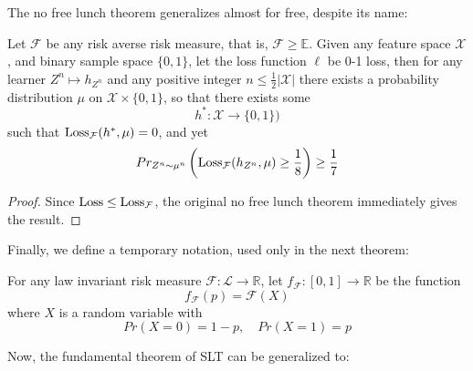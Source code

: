 The no free lunch theorem generalizes almost for free, despite its name:
\begin{theorem}
\label{theorem:nfl_2}
Let $\mathcal{F}$ be any risk averse risk measure, that is, $\mathcal{F} \ge \mathbb{E}$. Given any feature space $\mathcal{X}$, and binary sample space $\{0, 1\}$, let the loss function $\ell$ be 0-1 loss, then for any learner $Z^n \mapsto h_{Z^n}$ and any positive integer $n \le \frac 1 2 |\mathcal{X}|$ there exists a probability distribution $\mu$ on $\mathcal{X}\times\{0, 1\}$, so that there exists some 
$$h^* : \mathcal{X} \to \{0, 1\})$$
such that $\operatorname{Loss}_\mathcal{F}(h^*, \mu) = 0$, and yet
\begin{equation}
	\label{eq:nfl_2}
	Pr_{Z^n \sim \mu^n}\left(\operatorname{Loss}_\mathcal{F}(h_{Z^n}, \mu) \ge \frac 1 8\right) \ge \frac 1 7
\end{equation}
\end{theorem}
\begin{proof}
Since $\operatorname{Loss} \le \operatorname{Loss}_\mathcal{F}$, the original no free lunch theorem immediately gives the result.
\end{proof}

Finally, we define a temporary notation, used only in the next theorem:
\begin{notn}
For any law invariant risk measure $\mathcal{F}: \mathscr{L} \to \mathbb{R}$, let $f_\mathcal{F} : [0, 1] \to \mathbb{R}$ be the function
$$f_\mathcal{F}(p) = \mathcal{F}(X)$$
where $X$ is a random variable with 
$$Pr(X = 0) = 1-p, \quad Pr(X = 1) = p$$
\end{notn}

Now, the fundamental theorem of SLT can be generalized to:

